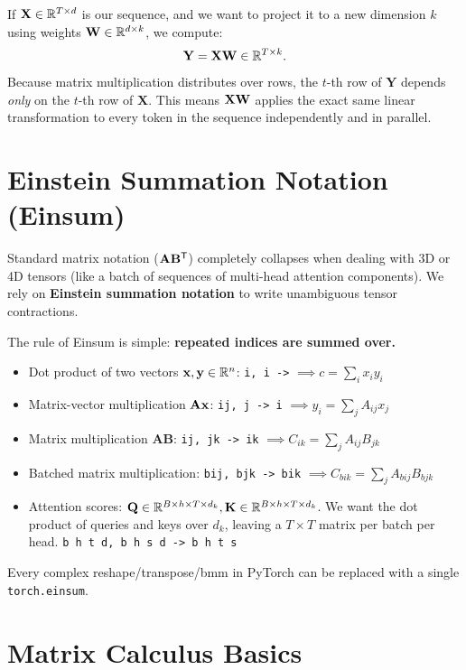 If $\mathbf{X} \in \mathbb{R}^{T \times d}$ is our sequence, and we want to project it to a new dimension $k$ using weights $\mathbf{W} \in \mathbb{R}^{d \times k}$, we compute:
\begin{equation}
\mathbf{Y} = \mathbf{X} \mathbf{W} \in \mathbb{R}^{T \times k}.
\end{equation}
Because matrix multiplication distributes over rows, the $t$-th row of $\mathbf{Y}$ depends \emph{only} on the $t$-th row of $\mathbf{X}$. This means $\mathbf{X} \mathbf{W}$ applies the exact same linear transformation to every token in the sequence independently and in parallel.

\section{Einstein Summation Notation (Einsum)}

Standard matrix notation ($\mathbf{A} \mathbf{B}^{\mathsf{T}}$) completely collapses when dealing with 3D or 4D tensors (like a batch of sequences of multi-head attention components). We rely on \textbf{Einstein summation notation} to write unambiguous tensor contractions.

The rule of Einsum is simple: \textbf{repeated indices are summed over.}
\begin{itemize}
    \item Dot product of two vectors $\mathbf{x}, \mathbf{y} \in \mathbb{R}^n$: \texttt{i, i ->} $\implies c = \sum_i x_i y_i$
    \item Matrix-vector multiplication $\mathbf{A} \mathbf{x}$: \texttt{ij, j -> i} $\implies y_i = \sum_j A_{ij} x_j$
    \item Matrix multiplication $\mathbf{A} \mathbf{B}$: \texttt{ij, jk -> ik} $\implies C_{ik} = \sum_j A_{ij} B_{jk}$
    \item Batched matrix multiplication: \texttt{bij, bjk -> bik} $\implies C_{bik} = \sum_j A_{bij} B_{bjk}$
    \item Attention scores: $\mathbf{Q} \in \mathbb{R}^{B \times h \times T \times d_k}, \mathbf{K} \in \mathbb{R}^{B \times h \times T \times d_k}$. 
          We want the dot product of queries and keys over $d_k$, leaving a $T \times T$ matrix per batch per head.
          \texttt{b h t d, b h s d -> b h t s}
\end{itemize}

Every complex reshape/transpose/bmm in PyTorch can be replaced with a single \texttt{torch.einsum}.

\section{Matrix Calculus Basics}

